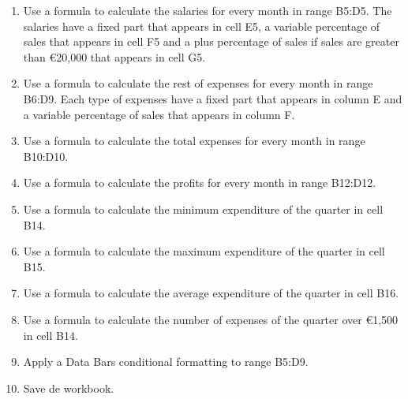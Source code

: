 \begin{enumerate}[leftmargin=*,resume]
\begin{enumerate}
\item Use a formula to calculate the salaries for every month in range B5:D5. The salaries have a fixed part that
appears in cell E5, a variable percentage of sales that appears in cell F5 and a plus percentage of sales if sales are greater than €20,000
that appears in cell G5.
\item Use a formula to calculate the rest of expenses for every month in range B6:D9. Each type of expenses have a fixed
part that appears in column E and a variable percentage of sales that appears in column F. 
\item Use a formula to calculate the total expenses for every month in range B10:D10. 
\item Use a formula to calculate the profits for every month in range B12:D12.
\item Use a formula to calculate the minimum expenditure of the quarter in cell B14.
\item Use a formula to calculate the maximum expenditure of the quarter in cell B15.
\item Use a formula to calculate the average expenditure of the quarter in cell B16.
\item Use a formula to calculate the number of expenses of the quarter over €1,500 in cell B14.
\item Apply a Data Bars conditional formatting to range B5:D9.
\item Save de workbook.
\end{enumerate}


\end{enumerate}
